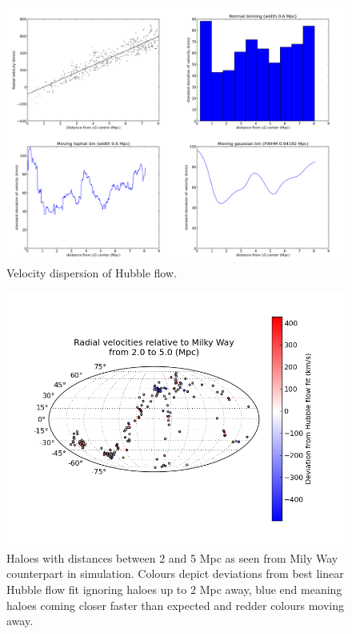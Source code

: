 \documentclass[english, oneside]{HYgradu}
\begin{document}
\begin{figure}
   \centering
   \includegraphics[width=\textwidth]{kuvat/velocitydispersion.png}
   \caption{Velocity dispersion of Hubble flow.}\label{fig:velocitydispersion}
\end{figure}

\begin{figure}
   \centering
   \includegraphics[width=\textwidth]{kuvat/anisotropy-aligned.png}
   \caption{Haloes with distances between 2 and 5 Mpc as seen from Mily Way counterpart in simulation. Colours depict deviations from best linear Hubble flow fit ignoring haloes up to 2 Mpc away, blue end meaning haloes coming closer faster than expected and redder colours moving away.}\label{fig:anisotropymap}
\end{figure}
\end{document}
